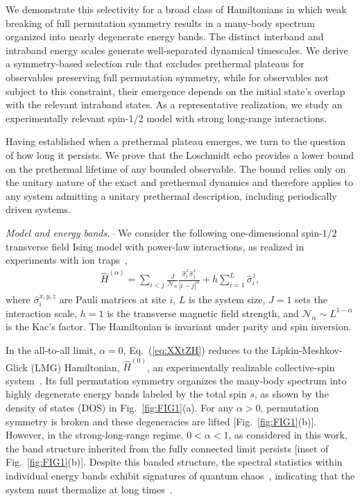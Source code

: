 \documentclass[aps,prl,amsfonts,floatfix,superscriptaddress,longbibliography,twocolumn,footinbib]{revtex4-2}
\begin{document}
We demonstrate this selectivity for a broad class of Hamiltonians in which weak breaking of full permutation symmetry results in a many-body spectrum organized into nearly degenerate energy bands. The distinct interband and intraband energy scales generate well-separated dynamical timescales. We derive a symmetry-based selection rule that excludes prethermal plateaus for observables preserving full permutation symmetry, while for observables not subject to this constraint, their emergence depends on the initial state's overlap with the relevant intraband states. As a representative realization, we study an experimentally relevant spin-1/2 model with strong long-range interactions.

Having established when a prethermal plateau emerges, we turn to the question of how long it persists. We prove that the Loschmidt echo provides a lower bound on the prethermal lifetime of any bounded observable. The bound relies only on the unitary nature of the exact and prethermal dynamics and therefore applies to any system admitting a unitary prethermal description, including periodically driven systems.


{\em Model and energy bands.--} We consider the following one-dimensional spin-$1/2$ transverse field Ising model with power-law interactions, as realized in experiments with ion traps~\cite{Jurcevic2014,Richerme2014,Neyenhuise2017},
\begin{align}
\hat{H}^{(\alpha)} = \sum_{i<j} \frac{J}{\mathcal{N}_\alpha} \frac{\hat{\sigma}_i^x \hat{\sigma}_j^x}{|i-j|^\alpha}
+ h \sum_{i=1}^{L} \hat{\sigma}_i^z,
\label{eq:XXtZH}
\end{align}
where $\hat{\sigma}_i^{x,y,z}$ are Pauli matrices at site $i$, $L$ is the system size, $J=1$ sets the interaction scale, $h=1$ is the transverse magnetic field strength, and $\mathcal{N}_\alpha \sim L^{1-\alpha}$ is the Kac's factor. The Hamiltonian is invariant under parity and spin inversion. 

In the all-to-all limit, $\alpha=0$, Eq.~(\ref{eq:XXtZH}) reduces to the Lipkin-Meshkov-Glick (LMG) Hamiltonian, $\hat{H}^{(0)}$, an experimentally realizable collective-spin system~\cite{Li2023,Luo2025}. Its full permutation symmetry organizes the many-body spectrum into highly degenerate energy bands labeled by the total spin $s$, as shown by the density of states (DOS) in Fig.~\ref{fig:FIG1}(a). For any $\alpha>0$, permutation symmetry is broken and these degeneracies are lifted [Fig.~\ref{fig:FIG1}(b)]. However, in the strong-long-range regime, $0<\alpha<1$, as considered in this work, the band structure inherited from the fully connected limit persists [inset of Fig.~\ref{fig:FIG1}(b)]. Despite this banded structure, the spectral statistics within individual energy bands exhibit signatures of quantum chaos~\cite{Russomanno2021,Pal2025}, indicating that the system must thermalize at long times~\cite{Pal2025,Sriram2026}. 
\end{document}
